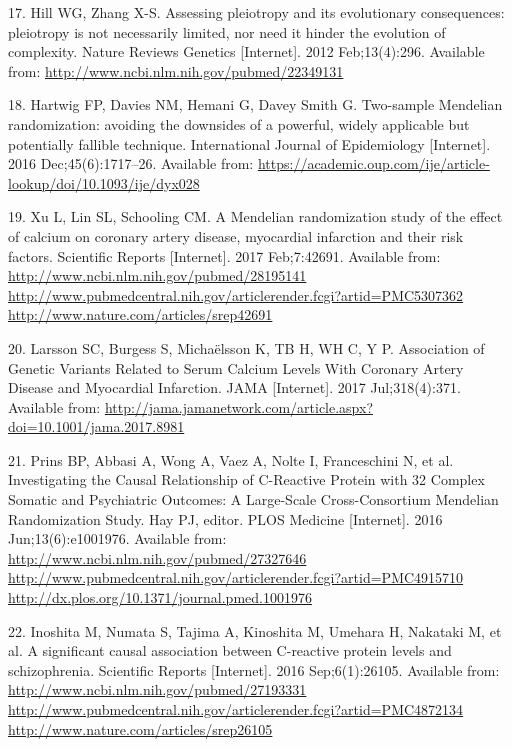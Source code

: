 \documentclass[]{article}
\begin{document}
\hypertarget{ref-Hill2012a}{}
17. Hill WG, Zhang X-S. Assessing pleiotropy and its evolutionary
consequences: pleiotropy is not necessarily limited, nor need it hinder
the evolution of complexity. Nature Reviews Genetics {[}Internet{]}.
2012 Feb;13(4):296. Available from:
\url{http://www.ncbi.nlm.nih.gov/pubmed/22349131}

\hypertarget{ref-Hartwig2016}{}
18. Hartwig FP, Davies NM, Hemani G, Davey Smith G. Two-sample Mendelian
randomization: avoiding the downsides of a powerful, widely applicable
but potentially fallible technique. International Journal of
Epidemiology {[}Internet{]}. 2016 Dec;45(6):1717--26. Available from:
\url{https://academic.oup.com/ije/article-lookup/doi/10.1093/ije/dyx028}

\hypertarget{ref-Xu2017}{}
19. Xu L, Lin SL, Schooling CM. A Mendelian randomization study of the
effect of calcium on coronary artery disease, myocardial infarction and
their risk factors. Scientific Reports {[}Internet{]}. 2017 Feb;7:42691.
Available from:
\href{http://www.ncbi.nlm.nih.gov/pubmed/28195141\%20http://www.pubmedcentral.nih.gov/articlerender.fcgi?artid=PMC5307362\%20http://www.nature.com/articles/srep42691}{http://www.ncbi.nlm.nih.gov/pubmed/28195141 http://www.pubmedcentral.nih.gov/articlerender.fcgi?artid=PMC5307362 http://www.nature.com/articles/srep42691}

\hypertarget{ref-Larsson2017}{}
20. Larsson SC, Burgess S, Michaëlsson K, TB H, WH C, Y P. Association
of Genetic Variants Related to Serum Calcium Levels With Coronary Artery
Disease and Myocardial Infarction. JAMA {[}Internet{]}. 2017
Jul;318(4):371. Available from:
\url{http://jama.jamanetwork.com/article.aspx?doi=10.1001/jama.2017.8981}

\hypertarget{ref-Prins2016}{}
21. Prins BP, Abbasi A, Wong A, Vaez A, Nolte I, Franceschini N, et al.
Investigating the Causal Relationship of C-Reactive Protein with 32
Complex Somatic and Psychiatric Outcomes: A Large-Scale Cross-Consortium
Mendelian Randomization Study. Hay PJ, editor. PLOS Medicine
{[}Internet{]}. 2016 Jun;13(6):e1001976. Available from:
\href{http://www.ncbi.nlm.nih.gov/pubmed/27327646\%20http://www.pubmedcentral.nih.gov/articlerender.fcgi?artid=PMC4915710\%20http://dx.plos.org/10.1371/journal.pmed.1001976}{http://www.ncbi.nlm.nih.gov/pubmed/27327646 http://www.pubmedcentral.nih.gov/articlerender.fcgi?artid=PMC4915710 http://dx.plos.org/10.1371/journal.pmed.1001976}

\hypertarget{ref-Inoshita2016}{}
22. Inoshita M, Numata S, Tajima A, Kinoshita M, Umehara H, Nakataki M,
et al. A significant causal association between C-reactive protein
levels and schizophrenia. Scientific Reports {[}Internet{]}. 2016
Sep;6(1):26105. Available from:
\href{http://www.ncbi.nlm.nih.gov/pubmed/27193331\%20http://www.pubmedcentral.nih.gov/articlerender.fcgi?artid=PMC4872134\%20http://www.nature.com/articles/srep26105}{http://www.ncbi.nlm.nih.gov/pubmed/27193331 http://www.pubmedcentral.nih.gov/articlerender.fcgi?artid=PMC4872134 http://www.nature.com/articles/srep26105}
\end{document}
